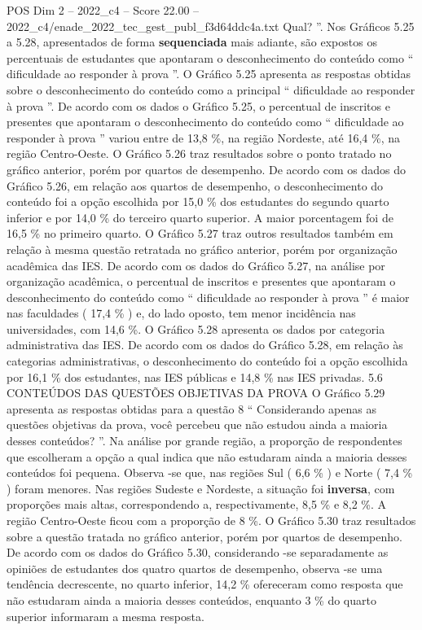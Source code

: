 \begin{textsample}{POS Dim 2 – 2022\_c4 – Score 22.00 – 2022\_c4/enade\_2022\_tec\_gest\_publ\_f3d64ddc4a.txt}
Qual? ”.
Nos Gráficos 5.25 a 5.28, apresentados de forma \textbf{sequenciada} mais adiante, são expostos os percentuais de estudantes que apontaram o desconhecimento do conteúdo como “ dificuldade ao responder à prova ”.
O Gráfico 5.25 apresenta as respostas obtidas sobre o desconhecimento do conteúdo como a principal “ dificuldade ao responder à prova ”.
De acordo com os dados o Gráfico 5.25, o percentual de inscritos e presentes que apontaram o desconhecimento do conteúdo como “ dificuldade ao responder à prova ” variou entre de 13,8 \%, na região Nordeste, até 16,4 \%, na região Centro-Oeste.
O Gráfico 5.26 traz resultados sobre o ponto tratado no gráfico anterior, porém por quartos de desempenho.
De acordo com os dados do Gráfico 5.26, em relação aos quartos de desempenho, o desconhecimento do conteúdo foi a opção escolhida por 15,0 \% dos estudantes do segundo quarto inferior e por 14,0 \% do terceiro quarto superior.
A maior porcentagem foi de 16,5 \% no primeiro quarto.
O Gráfico 5.27 traz outros resultados também em relação à mesma questão retratada no gráfico anterior, porém por organização acadêmica das IES.
De acordo com os dados do Gráfico 5.27, na análise por organização acadêmica, o percentual de inscritos e presentes que apontaram o desconhecimento do conteúdo como “ dificuldade ao responder à prova ” é maior nas faculdades ( 17,4 \% ) e, do lado oposto, tem menor incidência nas universidades, com 14,6 \%.
O Gráfico 5.28 apresenta os dados por categoria administrativa das IES.
De acordo com os dados do Gráfico 5.28, em relação às categorias administrativas, o desconhecimento do conteúdo foi a opção escolhida por 16,1 \% dos estudantes, nas IES públicas e 14,8 \% nas IES privadas. 5.6 CONTEÚDOS DAS QUESTÕES OBJETIVAS DA PROVA O Gráfico 5.29 apresenta as respostas obtidas para a questão 8 “ Considerando apenas as questões objetivas da prova, você percebeu que não estudou ainda a maioria desses conteúdos? ”.
Na análise por grande região, a proporção de respondentes que escolheram a opção a qual indica que não estudaram ainda a maioria desses conteúdos foi pequena.
Observa -se que, nas regiões Sul ( 6,6 \% ) e Norte ( 7,4 \% ) foram menores.
Nas regiões Sudeste e Nordeste, a situação foi \textbf{inversa}, com proporções mais altas, correspondendo a, respectivamente, 8,5 \% e 8,2 \%.
A região Centro-Oeste ficou com a proporção de 8 \%.
O Gráfico 5.30 traz resultados sobre a questão tratada no gráfico anterior, porém por quartos de desempenho.
De acordo com os dados do Gráfico 5.30, considerando -se separadamente as opiniões de estudantes dos quatro quartos de desempenho, observa -se uma tendência decrescente, no quarto inferior, 14,2 \% ofereceram como resposta que não estudaram ainda a maioria desses conteúdos, enquanto 3 \% do quarto superior informaram a mesma resposta.

\end{textsample}
